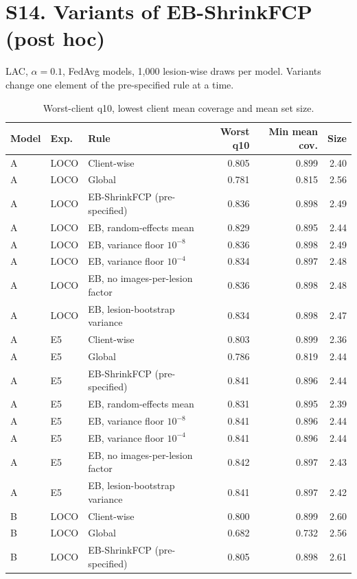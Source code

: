 \documentclass[10pt]{article}
\begin{document}
\section*{S14. Variants of EB-ShrinkFCP (post hoc)}
LAC, $\alpha=0.1$, FedAvg models, 1,000 lesion-wise draws per model. Variants change one element of the pre-specified rule at a time.
\begin{table}[!htbp]
\centering
\scriptsize
\caption{Worst-client q10, lowest client mean coverage and mean set size.}
\label{tab:s15}
\begin{tabular}{@{}lllrrr@{}}
\toprule
Model & Exp. & Rule & Worst q10 & Min mean cov. & Size \\
\midrule
A & LOCO & Client-wise & 0.805 & 0.899 & 2.40 \\
A & LOCO & Global & 0.781 & 0.815 & 2.56 \\
A & LOCO & EB-ShrinkFCP (pre-specified) & 0.836 & 0.898 & 2.49 \\
A & LOCO & EB, random-effects mean & 0.829 & 0.895 & 2.44 \\
A & LOCO & EB, variance floor $10^{-8}$ & 0.836 & 0.898 & 2.49 \\
A & LOCO & EB, variance floor $10^{-4}$ & 0.834 & 0.897 & 2.48 \\
A & LOCO & EB, no images-per-lesion factor & 0.836 & 0.898 & 2.48 \\
A & LOCO & EB, lesion-bootstrap variance & 0.834 & 0.898 & 2.47 \\
\midrule
A & E5 & Client-wise & 0.803 & 0.899 & 2.36 \\
A & E5 & Global & 0.786 & 0.819 & 2.44 \\
A & E5 & EB-ShrinkFCP (pre-specified) & 0.841 & 0.896 & 2.44 \\
A & E5 & EB, random-effects mean & 0.831 & 0.895 & 2.39 \\
A & E5 & EB, variance floor $10^{-8}$ & 0.841 & 0.896 & 2.44 \\
A & E5 & EB, variance floor $10^{-4}$ & 0.841 & 0.896 & 2.44 \\
A & E5 & EB, no images-per-lesion factor & 0.842 & 0.897 & 2.43 \\
A & E5 & EB, lesion-bootstrap variance & 0.841 & 0.897 & 2.42 \\
\midrule
B & LOCO & Client-wise & 0.800 & 0.899 & 2.60 \\
B & LOCO & Global & 0.682 & 0.732 & 2.56 \\
B & LOCO & EB-ShrinkFCP (pre-specified) & 0.805 & 0.898 & 2.61 \\

\end{tabular}
\end{table}
\end{document}
